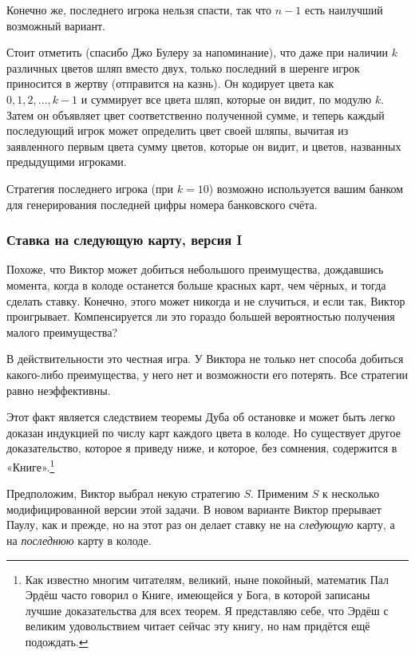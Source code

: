 Конечно же, последнего игрока нельзя спасти, так что $n-1$ есть наилучший возможный вариант.
\heart

Стоит отметить (спасибо Джо Булеру %
за напоминание), что даже при наличии $k$ различных цветов шляп вместо двух, только последний в шеренге игрок приносится в жертву (отправится на казнь).
Он кодирует цвета как $0, 1, 2, \dots, k-1$ и суммирует все цвета шляп, которые он видит, по модулю $k$.
Затем он объявляет цвет соответственно полученной сумме, и теперь каждый последующий игрок может определить цвет своей шляпы, вычитая из заявленного первым цвета сумму цветов, которые он видит, и цветов, названных предыдущими игроками.

Стратегия последнего игрока (при $k=10$) возможно используется вашим банком для генерирования последней цифры номера банковского счёта.

\subsubsection*{Ставка на следующую карту, версия I}%

Похоже, что Виктор может добиться небольшого преимущества, дождавшись момента, когда в колоде останется больше красных карт, чем чёрных, и тогда сделать ставку.
Конечно, этого может никогда и не случиться, и если так, Виктор проигрывает.
Компенсируется ли это гораздо большей вероятностью получения малого преимущества?

В действительности это честная игра.
У Виктора не только нет способа добиться какого-либо преимущества, у него нет и возможности его потерять.
Все стратегии равно неэффективны.

Этот факт является следствием теоремы Дуба об остановке %
и может быть легко доказан индукцией по числу карт каждого цвета в колоде.
Но существует другое доказательство, которое я приведу ниже, и которое, без сомнения, содержится в «Книге».\footnote{Как известно многим читателям, великий, ныне покойный, математик Пал Эрдёш часто говорил о Книге, имеющейся у Бога, в которой записаны лучшие доказательства для всех теорем.
Я представляю себе, что Эрдёш с великим удовольствием читает сейчас эту книгу, но нам придётся ещё подождать.}

Предположим, Виктор выбрал некую стратегию $S$.
Применим $S$ к несколько модифицированной версии этой задачи.
В новом варианте Виктор прерывает Паулу, как и прежде, но на этот раз он делает ставку не на \emph{следующую} карту, а на \emph{последнюю} карту в колоде.

